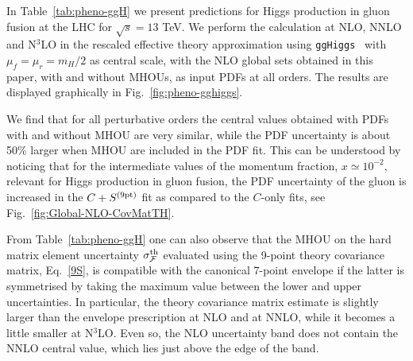 In Table~\ref{tab:pheno-ggH} 
we present predictions for Higgs production in gluon fusion
at the LHC for $\sqrt{s}=13$ TeV.
%
We perform the calculation at NLO, NNLO and N$^3$LO in the rescaled effective theory approximation
using {\tt  ggHiggs}~\cite{Ball:2013bra,Bonvini:2014jma,Bonvini:2016frm,Ahmed:2016otz,Bonvini:2018ixe,Bonvini:2018iwt} with
$\mu_f=\mu_r=m_H/2$ as central scale, with the
NLO global sets obtained in this paper, with and without MHOUs, as 
input PDFs at all orders.
%
The results are 
displayed graphically in Fig.~\ref{fig:pheno-gghiggs}.
%

We find that for all perturbative orders the central values obtained with PDFs with and without MHOU are very similar, while the PDF uncertainty
is about 50\% larger when MHOU are included in the PDF fit.
%
This can be understood by noticing that for the intermediate values of
the momentum fraction,  $x\simeq 10^{-2}$, 
relevant for Higgs production in gluon fusion, the PDF uncertainty of
the gluon is increased in the $C+S^{(\rm 9pt)}$ fit 
as compared to the $C$-only fits, see  Fig.~\ref{fig:Global-NLO-CovMatTH}.

From Table~\ref{tab:pheno-ggH} one can also observe that the MHOU on
the hard matrix element uncertainty
$\sigma_{\mathcal{F}}^{\rm th}$ evaluated using the 9-point theory covariance matrix, Eq.~\eqref{9S},
is compatible with the canonical 7-point envelope
if the latter is symmetrised by taking the maximum value between the lower and upper uncertainties.
%
In particular, the theory covariance matrix estimate
is slightly larger than the  envelope prescription
at NLO and at NNLO, while it becomes a little smaller at N$^3$LO.
%
Even so, the NLO uncertainty band does not contain the NNLO
central value, which lies just above the edge of the band. 

\begin{table}[tbp]
	\centering
	\small
	
        \vspace*{3mm}
	\caption{\small The 
          total cross-sections for Higgs production in gluon fusion
	(in pb) obtained by  
          using NLO global PDFs based on either $C$ or
	$C+S^{{\rm (9pt)}}$, 
          see Table~\ref{tab:thcovmatFits}.
          We quote the central prediction, the total PDF uncertainty (first) and
          the MHOU  uncertainty on the hard cross-section
	(second) expressed as a percentage of the central value. The latter is evaluated both using the theory
	covariance matrix (9-point prescription) or, in parenthesis, a
         (symmetrised) envelope of the 7-point scale variations (see
	Sect.~\ref{sec:combmhou}), obtained by taking the maximum value between the lower and upper uncertainties. }
	\label{tab:pheno-ggH}
\end{table}

